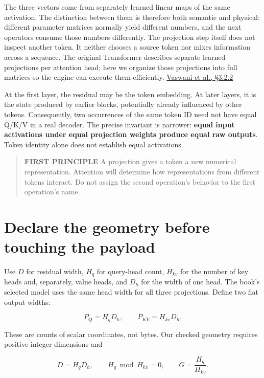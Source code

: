 The three vectors come from separately learned linear maps of the same
activation. The distinction between them is therefore both semantic and
physical: different parameter matrices normally yield different numbers,
and the next operators consume those numbers differently. The projection
step itself does not inspect another token. It neither chooses a source
token nor mixes information across a sequence. The original Transformer
describes separate learned projections per attention head; here we
organize those projections into full matrices so the engine can execute
them efficiently. \href{https://arxiv.org/abs/1706.03762}{Vaswani et
al., §3.2.2}

At the first layer, the residual may be the token embedding. At later
layers, it is the state produced by earlier blocks, potentially already
influenced by other tokens. Consequently, two occurrences of the same
token ID need not have equal Q/K/V in a real decoder. The precise
invariant is narrower: \textbf{equal input activations under equal
projection weights produce equal raw outputs}. Token identity alone does
not establish equal activations.

\begin{quote}
\textbf{FIRST PRINCIPLE} A projection gives a token a new numerical
representation. Attention will determine how representations from
different tokens interact. Do not assign the second operation's behavior
to the first operation's name.
\end{quote}

\section{Declare the geometry before touching the
payload}\label{declare-the-geometry-before-touching-the-payload}

Use \(D\) for residual width, \(H_q\) for query-head count, \(H_{kv}\)
for the number of key heads and, separately, value heads, and \(D_h\)
for the width of one head. The book's selected model uses the same head
width for all three projections. Define two flat output widths:

\begin{equation}
P_Q=H_qD_h,\qquad P_{KV}=H_{kv}D_h.
\end{equation}

These are counts of scalar coordinates, not bytes. Our checked geometry
requires positive integer dimensions and

\begin{equation}
D=H_qD_h,\qquad H_q\bmod H_{kv}=0,\qquad G=\frac{H_q}{H_{kv}}.
\end{equation}

